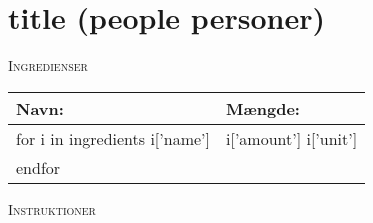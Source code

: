 \section{ {{title}} ({{people}} personer)}


\begin{center}
\textsc{Ingredienser}

\begin{tabular}{|p{4cm}|p{4cm}|}
  \hline
  \bf{Navn:} & \bf{Mængde:} \\
  \hline\hline

  {{for i in ingredients}}
    {{i['name']}} & {{i['amount']}} {{i['unit']}} \\ \hline
  {{endfor}}

  \hline
\end{tabular}

\vspace{.5cm}

\textsc{Instruktioner}\\

\end{center}

